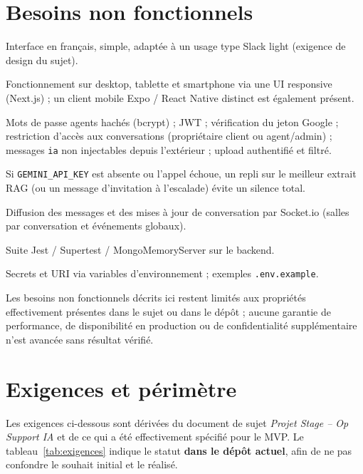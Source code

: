 \section{Besoins non fonctionnels}

\begin{description}[style=nextline,leftmargin=1.2em,font=\bfseries]
  \item[RNF01 --- Utilisabilité] Interface en français, simple, adaptée à un usage type Slack light (exigence de design du sujet).
  \item[RNF02 --- Adaptabilité d'écran] Fonctionnement sur desktop, tablette et smartphone via une UI responsive (Next.js) ; un client mobile Expo / React Native distinct est également présent.
  \item[RNF03 --- Sécurité] Mots de passe agents hachés (bcrypt) ; JWT ; vérification du jeton Google ; restriction d'accès aux conversations (propriétaire client ou agent/admin) ; messages \texttt{ia} non injectables depuis l'extérieur ; upload authentifié et filtré.
  \item[RNF04 --- Disponibilité du bot] Si \texttt{GEMINI\_API\_KEY} est absente ou l'appel échoue, un repli sur le meilleur extrait RAG (ou un message d'invitation à l'escalade) évite un silence total.
  \item[RNF05 --- Temps réel] Diffusion des messages et des mises à jour de conversation par Socket.io (salles par conversation et événements globaux).
  \item[RNF06 --- Testabilité] Suite Jest / Supertest / MongoMemoryServer sur le backend.
  \item[RNF07 --- Portabilité de configuration] Secrets et URI via variables d'environnement ; exemples \texttt{.env.example}.
\end{description}

Les besoins non fonctionnels décrits ici restent limités aux propriétés effectivement présentes dans le sujet ou dans le dépôt ; aucune garantie de performance, de disponibilité en production ou de confidentialité supplémentaire n'est avancée sans résultat vérifié.

\section{Exigences et périmètre}

Les exigences ci-dessous sont dérivées du document de sujet \textit{Projet Stage -- Op Support IA} et de ce qui a été effectivement spécifié pour le MVP. Le tableau~\ref{tab:exigences} indique le statut \textbf{dans le dépôt actuel}, afin de ne pas confondre le souhait initial et le réalisé.

